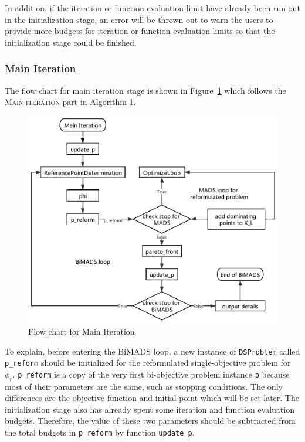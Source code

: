 \documentclass[11pt,oneside,onecolumn,openright]{article}
\begin{document}
  In addition, if the iteration or function evaluation limit have already been run out in the initialization stage, an error will be thrown out to warn the users to provide more budgets for iteration or function evaluation limits so that the initialization stage could be finished.

  \subsubsection{Main Iteration}
  The flow chart for main iteration stage is shown in Figure~\ref{fig:flow_main} which follows the \textsc{Main iteration} part in Algorithm 1.
  \begin{figure}[t] 
  \centering 
      \includegraphics[width=16cm]{fig/main_iter.pdf}
        \caption{Flow chart for Main Iteration} 
    \label{fig:flow_main} 
  \end{figure}

  To explain, before entering the BiMADS loop, a new instance of \verb|DSProblem| called \verb|p_reform| should be initialized for the reformulated single-objective problem for $\phi_r$. \verb|p_reform| is a copy of the very first bi-objective problem instance \verb|p| because most of their parameters are the same, such as stopping conditions. The only differences are the objective function and initial point which will be set later. The initialization stage also has already spent some iteration and function evaluation budgets. Therefore, the value of these two parameters should be subtracted from the total budgets in \verb|p_reform| by function \verb|update_p|.
\end{document}
